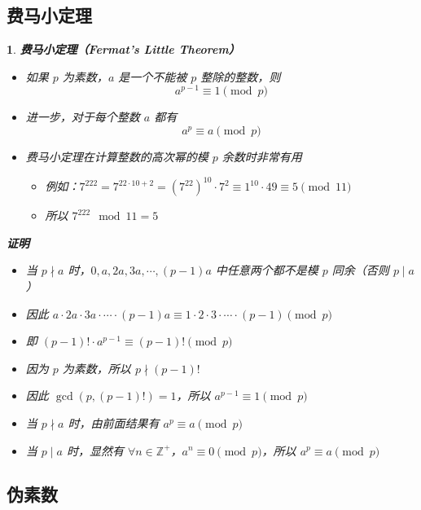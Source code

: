 \documentclass[UTF8]{report}
\theoremstyle{MyLineTheoremStyle} %
\theoremstyle{MyBlockTheoremStyle} %
\theoremstyle{MySubsubsectionStyle} %
\newtheorem{definition}{}
\begin{document}
\subsection{费马小定理}

\begin{definition}
    \textbf{费马小定理（Fermat’s Little Theorem）}
    \begin{itemize}
        \item 如果 $p$ 为素数，$a$ 是一个不能被 $p$ 整除的整数，则
        \[
        a^{p-1} \equiv 1 \pmod{p}
        \]
        \item 进一步，对于每个整数 $a$ 都有
        \[
        a^p \equiv a \pmod{p}
        \]
        \item 费马小定理在计算整数的高次幂的模 $p$ 余数时非常有用
        \begin{itemize}
            \item 例如：$7^{222} = 7^{22 \cdot 10 + 2} = (7^{22})^{10} \cdot 7^2 \equiv 1^{10} \cdot 49 \equiv 5 \pmod{11}$
            \item 所以 $7^{222} \mod 11 = 5$
        \end{itemize}
    \end{itemize}

    \textbf{证明}
    \begin{itemize}
        \item 当 $p \nmid a$ 时，$0, a, 2a, 3a, \cdots, (p-1)a$ 中任意两个都不是模 $p$ 同余（否则 $p \mid a$）
        \item 因此 $a \cdot 2a \cdot 3a \cdot \cdots \cdot (p-1)a \equiv 1 \cdot 2 \cdot 3 \cdot \cdots \cdot (p-1) \pmod{p}$
        \item 即 $(p-1)! \cdot a^{p-1} \equiv (p-1)! \pmod{p}$
        \item 因为 $p$ 为素数，所以 $p \nmid (p-1)!$
        \item 因此 $\gcd(p, (p-1)!) = 1$，所以 $a^{p-1} \equiv 1 \pmod{p}$
        \item 当 $p \nmid a$ 时，由前面结果有 $a^p \equiv a \pmod{p}$
        \item 当 $p \mid a$ 时，显然有 $\forall n \in \mathbb{Z}^+$，$a^n \equiv 0 \pmod{p}$，所以 $a^p \equiv a \pmod{p}$
    \end{itemize}
\end{definition}

\subsection{伪素数}
\end{document}
